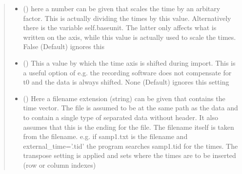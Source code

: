 \documentclass[letterpaper,10pt,english]{sphinxmanual}
\begin{document}
\begin{fulllineitems}
\begin{fulllineitems}
\begin{quote}
\begin{description}
\begin{itemize}
\item {} 
 (\sphinxstyleliteralemphasis{\sphinxupquote{ (}}\sphinxstyleliteralemphasis{\sphinxupquote{)}}) \textendash{} here a number can be given that scales the time by an arbitary factor. This is actually dividing
the times by this value. Alternatively there is the variable self.baseunit. The latter only affects
what is written on the axis, while this value is actually used to scale the times. False (Default)
ignores this

\item {} 
 (\sphinxstyleliteralemphasis{\sphinxupquote{, }}\sphinxstyleliteralemphasis{\sphinxupquote{ (}}\sphinxstyleliteralemphasis{\sphinxupquote{)}}) \textendash{} This a value by which the time axis is shifted during import. This is a useful option of e.g.
the recording software does not compensate for t0 and the data is always shifted.
None (Default) ignores this setting

\item {} 
 (\sphinxstyleliteralemphasis{\sphinxupquote{ (}}\sphinxstyleliteralemphasis{\sphinxupquote{)}}) \textendash{} Here a filename extension (string) can be given that contains the time vector.
The file is assumed to be at the same path as the data and to contain a single
type of separated data without header. It also assumes that this is the ending
for the file. The filename itself is taken from the filename.
e.g. if samp1.txt is the filename and external\_time=’.tid’ the program searches
samp1.tid for the times. The transpose setting is applied and sets where the times are
to be inserted (row or column indexes)


\end{itemize}
\end{description}
\end{quote}
\end{fulllineitems}
\end{fulllineitems}
\end{document}
